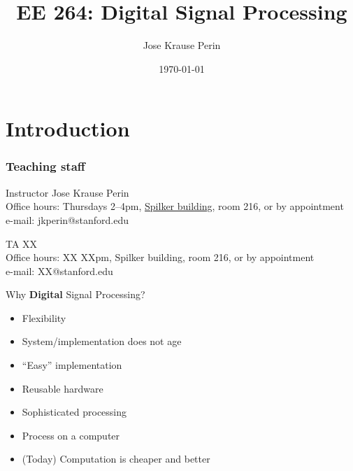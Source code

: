 \documentclass{beamer}
\title[EE 264]{EE 264: Digital Signal Processing}
\author{Jose Krause Perin}
\institute{Stanford University}
\date{\today}
\begin{document}
\begin{frame}
  \titlepage
\end{frame}


\section{Introduction}


\begin{frame}
\frametitle{Teaching staff}

\begin{block}{Instructor}
Jose Krause Perin \\
Office hours: Thursdays 2--4pm, \href{https://campus-map.stanford.edu/?id=04-040&lat=37.42879024&lng=-122.1740029&zoom=17&srch=spilker}{Spilker building}, room 216, or by appointment \\
e-mail: jkperin@stanford.edu
\end{block}
\vskip 1cm
\begin{block}{TA}
XX \\
Office hours: XX XXpm, Spilker building, room 216, or by appointment \\
e-mail: XX@stanford.edu
\end{block}
    	
\end{frame}

%
\begin{frame}{Why {\bf Digital} Signal Processing?}

\begin{itemize}
  \item Flexibility
  \item System/implementation does not age
  \item “Easy” implementation
  \item Reusable hardware
  \item Sophisticated processing
  \item Process on a computer
  \item (Today) Computation is cheaper and better
\end{itemize}

\end{frame}
\end{document}
